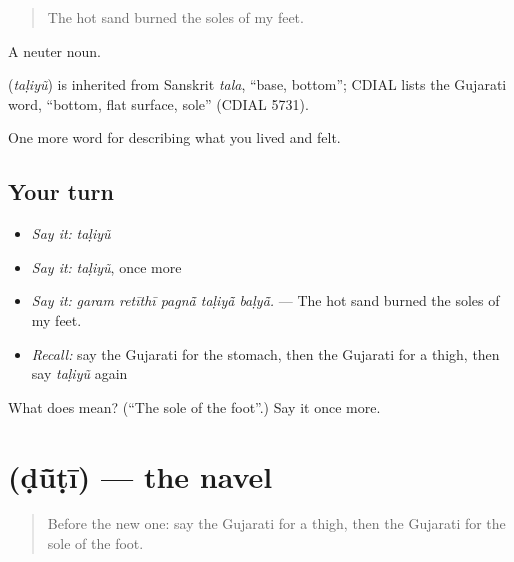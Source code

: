 \begin{quote}
The hot sand burned the soles of my feet.
\end{quote}

A neuter noun.

\begin{cousinweb}
\textbf{} (\emph{taḷiyũ}) is inherited from Sanskrit \emph{tala}, \textquotedblleft{}base, bottom\textquotedblright{}; CDIAL lists the Gujarati word, \textquotedblleft{}bottom, flat surface, sole\textquotedblright{} (CDIAL 5731).
\end{cousinweb}

\begin{grammarlens}[title={What you've built}]
One more word for describing what you lived and felt.
\end{grammarlens}

\subsection*{Your turn}
\begin{itemize}
\raggedright
  \item \emph{Say it:} \emph{taḷiyũ}
  \item \emph{Say it:} \emph{taḷiyũ}, once more
  \item \emph{Say it:} \emph{garam retīthī pagnā̃ taḷiyā̃ baḷyā̃.} — The hot sand burned the soles of my feet.
  \item \emph{Recall:} say the Gujarati for the stomach, then the Gujarati for a thigh, then say \emph{taḷiyũ} again
\end{itemize}

\begin{tcolorbox}[breakable,colback=teal!4,colframe=teal!35!black,title={Before you move on}]
What does  mean? (\textquotedblleft{}The sole of the foot\textquotedblright{}.) Say it once more.
\end{tcolorbox}
\section[\texorpdfstring{\gu{ડૂંટી} (ḍū̃ṭī)}{ડૂંટી (ḍū̃ṭī)}]{ (ḍū̃ṭī) — the navel}

\label{lesson:GU-C473-duti}



\begin{quote}
Before the new one: say the Gujarati for a thigh, then the Gujarati for the sole of the foot.
\end{quote}

